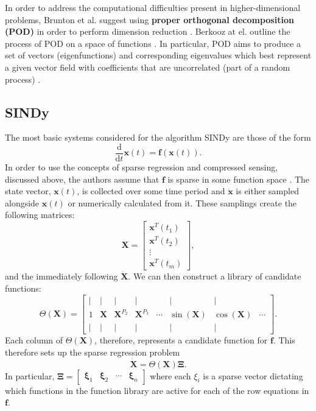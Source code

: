 \documentclass[10pt]{paper}
\begin{document}
In order to address the computational difficulties present in higher-dimensional problems, Brunton et al. suggest using \textbf{proper orthogonal decomposition (POD)} in order to perform dimension reduction \cite{sindy}. 
Berkooz at el. outline the process of POD on a space of functions \cite{berkooz}. In particular, POD aims to produce a set of vectors (eigenfunctions) and corresponding eigenvalues which best represent a given vector field with coefficients that are uncorrelated (part of a random process) \cite{berkooz}. 

\subsection{SINDy}
The most basic systems considered for the algorithm SINDy are those of the form 
\[ \frac{\mathrm d}{\mathrm dt} \boldsymbol x(t) = \boldsymbol f (\boldsymbol x(t)). \]
In order to use the concepts of sparse regression and compressed sensing, discussed above, the authors assume that $\boldsymbol f$ is sparse in some function space \cite{sindy}.
The state vector, $\boldsymbol x(t)$, is collected over some time period and $\boldsymbol {\dot x}$ is either sampled alongside $\boldsymbol x(t)$ or numerically calculated from it. 
These samplings create the following matrices: 
\[ \boldsymbol X = \begin{bmatrix}
	\boldsymbol x^T(t_1) \\ \boldsymbol x^T(t_2) \\ \vdots \\ \boldsymbol x^T(t_m)
\end{bmatrix}, \]  
and the immediately following $\boldsymbol {\dot X}$. We can then construct a library of candidate functions: 
\[  \Theta(\boldsymbol X) = \begin{bmatrix} \mid & \mid & \mid & \mid &  & \mid & \mid & \\ 1 & \boldsymbol X & {\boldsymbol X}^{P_2} & {\boldsymbol X}^{P_3} & \cdots & \sin{(\boldsymbol X)} & \cos{(\boldsymbol X)} & \cdots \\ \mid & \mid & \mid & \mid & & \mid & \mid & \end{bmatrix}.  \]
Each column of $\Theta(\boldsymbol X)$, therefore, represents a candidate function for $\boldsymbol f$. This therefore sets up the sparse regression problem 
\[ \boldsymbol {\dot X} = \Theta(\boldsymbol X)\boldsymbol \Xi. \]
In particular, $\boldsymbol \Xi = \begin{bmatrix}
	\boldsymbol \xi_1 & \boldsymbol \xi_2 & \cdots & \boldsymbol \xi_n
\end{bmatrix}$ where each $\xi_i$ is a sparse vector dictating which functions in the function library are active for each of the row equations in $\boldsymbol f$. 
\end{document}
